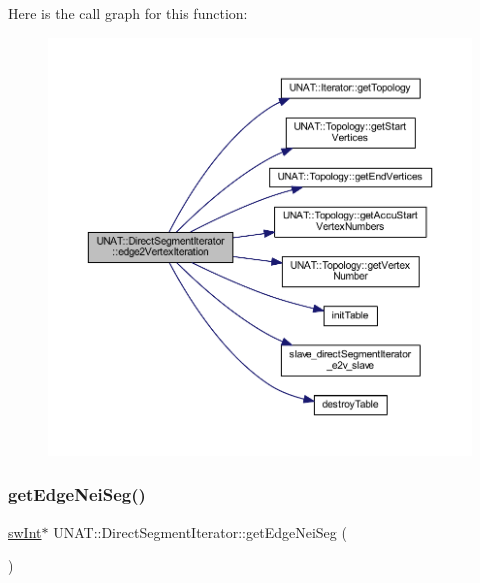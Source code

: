 Here is the call graph for this function\+:
\nopagebreak
\begin{figure}[H]
\begin{center}
\leavevmode
\includegraphics[width=350pt]{classUNAT_1_1DirectSegmentIterator_a4b4de063d998f54f092a3ca779fd818f_cgraph}
\end{center}
\end{figure}
\mbox{\label{classUNAT_1_1DirectSegmentIterator_a6f801e4fff4b069d6b1fcc3e70073639}} 
\subsubsection{\texorpdfstring{getEdgeNeiSeg()}{getEdgeNeiSeg()}\hspace{0.1cm}{\footnotesize\ttfamily [1/2]}}
{\footnotesize\ttfamily \mbox{\hyperlink{include_2swMacro_8h_a113cf5f6b5377cdf3fac6aa4e443e9aa}{sw\+Int}}$\ast$ U\+N\+A\+T\+::\+Direct\+Segment\+Iterator\+::get\+Edge\+Nei\+Seg (\begin{DoxyParamCaption}{ }\end{DoxyParamCaption})\hspace{0.3cm}{\ttfamily [inline]}}

